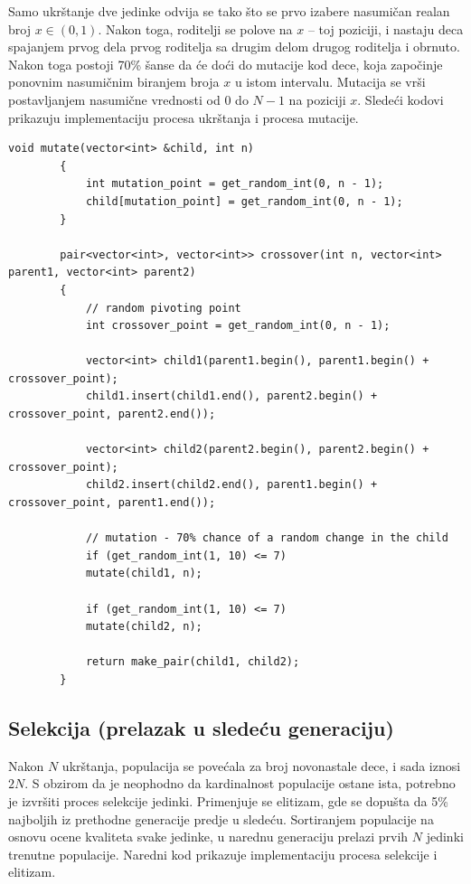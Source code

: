 \documentclass[12pt, a4paper]{article}
\begin{document}
	Samo ukrštanje dve jedinke odvija se tako što se prvo izabere nasumičan realan broj $x\in(0, 1)$. Nakon toga, roditelji se polove na $x$ – toj poziciji, i nastaju deca spajanjem prvog dela prvog roditelja sa drugim delom drugog roditelja i obrnuto. Nakon toga postoji 70\% šanse da će doći do mutacije kod dece, koja započinje ponovnim nasumičnim biranjem broja $x$ u istom intervalu. Mutacija se vrši posta\-vljanjem nasumične vrednosti od 0 do $N-1$ na poziciji $x$. Sledeći kodovi prikazuju implementaciju procesa ukrštanja i procesa mutacije.\\
	
	\begin{lstlisting}[caption={Proces ukrštanja}]
		void mutate(vector<int> &child, int n)
		{
			int mutation_point = get_random_int(0, n - 1);
			child[mutation_point] = get_random_int(0, n - 1);
		}
		
		pair<vector<int>, vector<int>> crossover(int n, vector<int> parent1, vector<int> parent2)
		{
			// random pivoting point
			int crossover_point = get_random_int(0, n - 1);
			
			vector<int> child1(parent1.begin(), parent1.begin() + crossover_point);
			child1.insert(child1.end(), parent2.begin() + crossover_point, parent2.end());
			
			vector<int> child2(parent2.begin(), parent2.begin() + crossover_point);
			child2.insert(child2.end(), parent1.begin() + crossover_point, parent1.end());
			
			// mutation - 70% chance of a random change in the child
			if (get_random_int(1, 10) <= 7)
			mutate(child1, n);
			
			if (get_random_int(1, 10) <= 7)
			mutate(child2, n);
			
			return make_pair(child1, child2);
		}\end{lstlisting}
	
	\subsection{Selekcija (prelazak u sledeću generaciju)}
	Nakon $N$ ukrštanja, populacija se povećala za broj novonastale dece, i sada iznosi $2N$. S obzirom da je neophodno da kardinalnost populacije ostane ista, potrebno je izvršiti proces selekcije jedinki. Primenjuje se elitizam, gde se dopušta da 5\% najboljih iz prethodne generacije predje u sledeću. Sortiranjem populacije na osnovu ocene kvaliteta svake jedinke, u narednu generaciju prelazi prvih $N$ jedinki trenutne populacije. Naredni kod prikazuje implementaciju procesa selekcije i elitizam.\\
	
\end{document}
